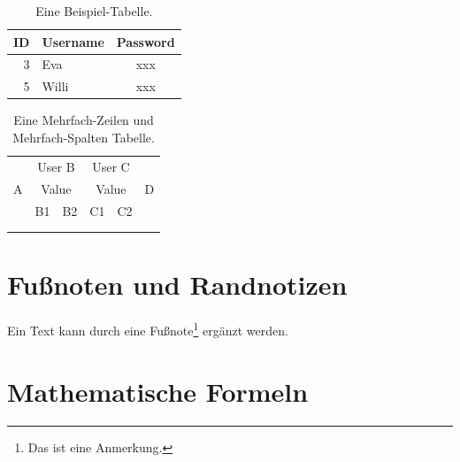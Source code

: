 \begin{appendix}
\begin{table}[htbp]
\begin{center}
\begin{tabular}{|r||l|c|} 
\hline 
ID 	& Username 	& Password 	\\ 
\hline 
\hline
3 	& Eva 		& xxx 		\\ 
\hline
5 	& Willi 	& xxx 		\\ 
\hline
\end{tabular}
\end{center}
\caption{Eine Beispiel-Tabelle.}
\label{UserTable}
\end{table}


\begin{table}[htbp]
\begin{center}
	\begin{tabular}{|c|c|c|c|c|c|}
	\hline
	\multirow{3}{*}{A} & \multicolumn{2}{c|}{User B} & %
	    \multicolumn{2}{c|}{User C} & \multirow{3}{*}{D}\\
	\cline{2-5}
	 & \multicolumn{2}{c|}{Value} & \multicolumn{2}{c|}{Value} & \\
	\cline{2-5}
	 & B1 & B2 & C1 & C2 & \\
	\hline
	 & & & & & \\
	\hline
	 & & & & & \\
	\hline
	\end{tabular}
\end{center}
\caption{Eine Mehrfach-Zeilen und Mehrfach-Spalten Tabelle.}
\end{table}


\newpage


\section{Fußnoten und Randnotizen}
Ein Text kann durch eine Fußnote\footnote{Das ist eine Anmerkung.} ergänzt
werden.


\newpage


\section{Mathematische Formeln}


\end{appendix}
